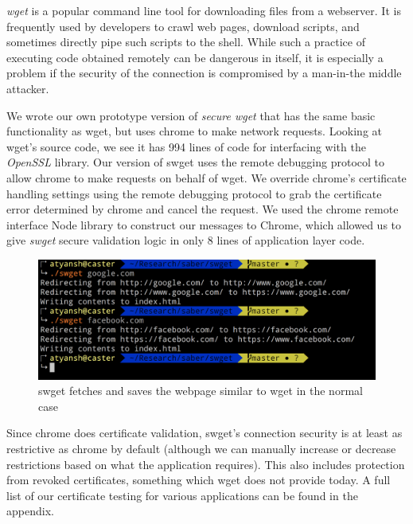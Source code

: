\emph{wget} is a popular command line tool for downloading files from a
webserver. It is frequently used by developers to crawl web pages, download
scripts, and sometimes directly pipe such scripts to the shell. While such a
practice of executing code obtained remotely can be dangerous in itself, it
is especially a problem if the security of the connection is compromised by a
man-in-the middle attacker.

We wrote our own prototype version of \emph{secure wget} that has the same
basic functionality as wget, but uses chrome to make network requests. Looking
at wget's source code, we see it has 994 lines of code for interfacing with the
\emph{OpenSSL} library. Our version of swget uses the remote debugging protocol
to allow chrome to make requests on behalf of wget. We override chrome's
certificate handling settings using the remote debugging protocol to grab the
certificate error determined by chrome and cancel the request. We used the
chrome remote interface Node library to construct our messages to Chrome, which
allowed us to give \emph{swget} secure validation logic in only 8 lines of
application layer code.


\begin{figure}[h]
  \includegraphics[width=\textwidth]{figures/regular}
  \caption[Regular usage of swget]{swget fetches and saves the webpage similar
  to wget in the normal case}
  \label{fig:regular-saber}
\end{figure}

Since chrome does certificate validation, swget's connection security is at
least as restrictive as chrome by default (although we can manually increase or
decrease restrictions based on what the application requires). This also
includes protection from revoked certificates, something which wget does not
provide today. A full list of our certificate testing for various applications
can be found in the appendix.

